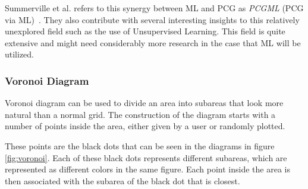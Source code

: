 Summerville et al. refers to this synergy between ML and PCG as \textit{PCGML} (PCG via ML)~\cite{lmao_ml}.
They also contribute with several interesting insights to this relatively unexplored field such as the use of Unsupervised Learning.
This field is quite extensive and might need considerably more research in the case that ML will be utilized.

\subsubsection{Voronoi Diagram}
Voronoi diagram can be used to divide an area into subareas that look more natural than a normal grid. 
The construction of the diagram starts with a number of points inside the area, either given by a user or randomly plotted. 

These points are the black dots that can be seen in the diagrams in figure \ref{fig:voronoi}.
Each of these black dots represents different subareas, which are represented as different colors in the same figure.
Each point inside the area is then associated with the subarea of the black dot that is closest.


